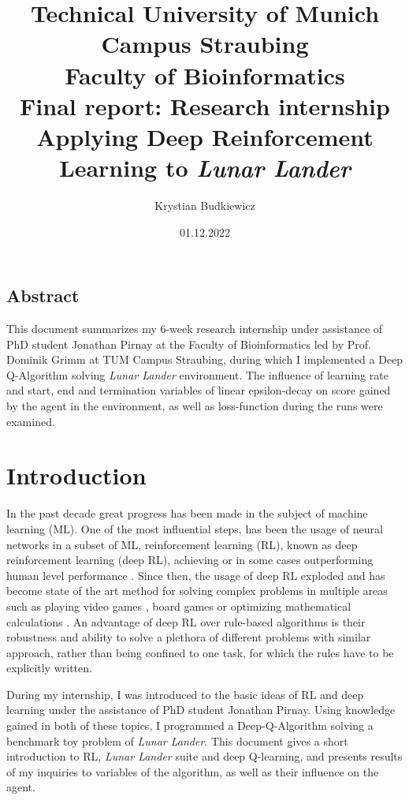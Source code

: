\documentclass{article}
\title{
  \textbf{
    \huge Technical University of Munich \\ Campus Straubing \\ Faculty of Bioinformatics
        }\\
  \vspace{0,25cm}
  \huge Final report: Research internship \\ Applying Deep Reinforcement Learning to \textit{Lunar Lander}
  }
\author{\huge Krystian Budkiewicz}
\date{\huge 01.12.2022}
\begin{document}
\maketitle
\vspace{4cm}
\tableofcontents
\pagebreak

\begin{centering}
    \section*{Abstract}
    This document summarizes my 6-week research internship under assistance of PhD student Jonathan Pirnay at the Faculty of Bioinformatics led by Prof. Dominik Grimm at TUM Campus Straubing, during which I implemented a Deep Q-Algorithm solving \textit{Lunar Lander} environment. The influence of learning rate and start, end and termination variables of linear epsilon-decay on score gained by the agent in the environment, as well as loss-function during the runs were examined.
\end{centering}

\section{Introduction}
In the past decade great progress has been made in the subject of machine learning (ML). One of the most influential steps, has been the usage of neural networks in a subset of ML, reinforcement learning (RL), known as deep reinforcement learning (deep RL), achieving or in some cases outperforming human level performance \cite{mnih2015human}. Since then, the usage of deep RL exploded and has become state of the art method for solving complex problems in multiple areas such as playing video games \cite{mnih2015human}\cite{mnih2013playing}, board games \cite{silver2016mastering}\cite{silver2018general} or optimizing mathematical calculations \cite{fawzi2022discovering}. An advantage of deep RL over rule-based algorithms is their robustness and ability to solve a plethora of different problems with similar approach, rather than being confined to one task, for which the rules have to be explicitly written.

During my internship, I was introduced to the basic ideas of RL and deep learning under the assistance of PhD student Jonathan Pirnay. Using knowledge gained in both of these topics, I programmed a Deep-Q-Algorithm solving a benchmark toy problem of \textit{Lunar Lander}. This document gives a short introduction to RL, \textit{Lunar Lander} suite and deep Q-learning, and  presents results of my inquiries to variables of the algorithm, as well as their influence on the agent.
\end{document}
